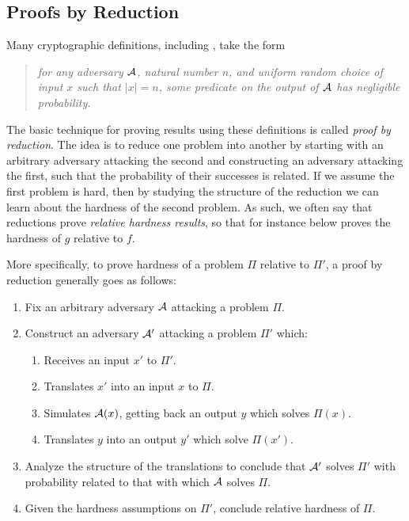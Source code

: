 \subsection{Proofs by Reduction}

Many cryptographic definitions, including ,
take the form \begin{quote}\emph{for any adversary $\mathcal{A}$, natural number $n$, and uniform
random choice of input $x$ such that $|x| = n$, some predicate on the output
of $\mathcal{A}$ has negligible probability.}\end{quote} The basic technique for proving results
using these definitions is called \emph{proof by reduction}. The idea is to
reduce one problem into another by starting with an arbitrary adversary
attacking the second and constructing an adversary attacking the first,
such that the probability of their successes is related. If we assume the first
problem is hard, then by studying the structure of the reduction we can learn
about the hardness of the second problem. As such, we often say that reductions
prove \emph{relative hardness results}, so that for instance 
below proves the hardness of $g$ relative to $f$.


More specifically, to prove hardness of a problem $\Pi$ relative to $\Pi'$, a
proof by reduction generally goes as follows:
\begin{enumerate}
  \item Fix an arbitrary adversary $\mathcal{A}$ attacking a problem $\Pi$.
  \item Construct an adversary $\mathcal{A}'$ attacking a problem $\Pi'$ which:
    \begin{enumerate}
      \item Receives an input $x'$ to $\Pi'$.
      \item Translates $x'$ into an input $x$ to $\Pi$.
      \item Simulates $\mathcal{A}(x)$, getting back an output $y$ which solves
        $\Pi(x)$.
      \item Translates $y$ into an output $y'$ which solve $\Pi(x')$.
    \end{enumerate}
  \item Analyze the structure of the translations to conclude that $\mathcal{A}'$ solves
    $\Pi'$ with probability related to that with which $\mathcal{A}$ solves $\Pi$.
  \item Given the hardness assumptions on $\Pi'$, conclude relative hardness of
    $\Pi$.
\end{enumerate}

